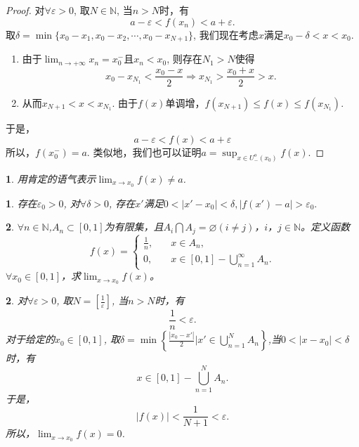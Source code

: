 \documentclass[utf8]{book}
\newtheorem{example}{}[section]             %
\newtheorem{solution}{}
\let\emptyset\varnothing
\begin{document}
\begin{proof}对$\forall \varepsilon>0$, 取$N\in\mathbb{N}$, 当$n>N$时，有
$$a -\varepsilon < f(x_n) < a+\varepsilon.$$
取$\delta = \min\{x_0 - x_1, x_0-x_2,\cdots,x_0-x_{N+1}\}$, 我们现在考虑$x$满足$x_0-\delta < x < x_0$.
\renewcommand\labelenumi{\normalfont(\theenumi)}
\begin{enumerate}
\item 由于$\displaystyle\lim_{n\to +\infty}x_n=x^-_0$且$x_n < x_0$, 则存在$N_1 > N$使得$$x_0 - x_{N_1} < \frac{x_0-x}{2}\Rightarrow x_{N_1}>\frac{x_0+x}{2}>x.$$
\item 从而$x_{N+1} < x < x_{N_1}$. 由于$f(x)$单调增，$f(x_{N+1}) \leq f(x) \leq f(x_{N_1})$.
\end{enumerate}
于是，
$$a-\varepsilon < f(x) < a + \varepsilon$$
所以，$f(x_0^-)=a$. 类似地，我们也可以证明$a=\displaystyle\sup_{x\in U_{-}^o(x_0)}f(x)$.
\end{proof}
\begin{example}
用肯定的语气表示$\displaystyle\lim_{x\to x_0}f(x)\neq a$.
\end{example}
\begin{solution}
存在$\varepsilon_0 > 0$, 对$\forall \delta > 0$, 存在$x'$满足$0<|x'-x_0|<\delta, |f(x') - a| > \varepsilon_0.$
\end{solution}
\begin{example}
$\forall n\in\mathbb{N}$,$A_n\subset[0,1]$为有限集，且$A_i\bigcap A_j=\emptyset(i\neq j)$，$i$，$j\in \mathbb{N}$。定义函数
\begin{equation*}
f(x)=
\begin{cases}
\frac{1}{n}, \quad &x\in A_n,\\
0, \quad &x\in [0,1]-\displaystyle\bigcup_{n=1}^{\infty}A_n.
\end{cases}
\end{equation*}
$\forall x_0\in[0,1]$，求$\displaystyle\lim_{x\to x_0}f(x)$。
\end{example}
\begin{solution}对$\forall \varepsilon > 0$, 取$N=\left[\displaystyle\frac{1}{\varepsilon}\right]$, 
当$n>N$时，有$$\frac{1}{n} < \varepsilon.$$
对于给定的$x_0\in[0,1]$, 取$\delta = \min\left\{\displaystyle\frac{|x_0 - x'|}{2}\Bigg| x'\in \displaystyle\bigcup_{n=1}^{N}A_n\right\}$,当$0<|x-x_0|<\delta$时，有
$$x\in[0,1]-\displaystyle\bigcup_{n=1}^{N}A_n.$$
于是，$$|f(x)| <\frac{1}{N+1} < \varepsilon.$$
所以，$\displaystyle\lim_{x\to x_0}f(x)=0$.
\end{solution}
\end{document}
